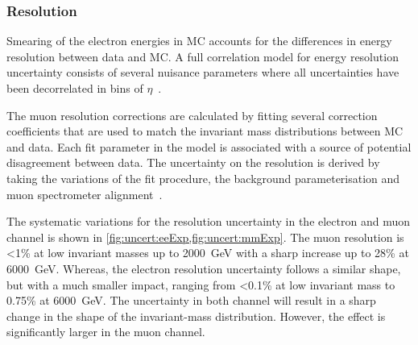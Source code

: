 \subsubsection{Resolution}
Smearing of the electron energies in MC accounts for the differences in energy resolution between data and MC. A full correlation model for energy resolution uncertainty consists of several nuisance parameters where all uncertainties have been decorrelated in bins of $\eta$~\cite{Aad:2019tso}.

The muon resolution corrections are calculated by fitting several correction coefficients that are used to match the invariant mass distributions between MC and data. Each fit parameter in the model is associated with a source of potential disagreement between data. The uncertainty on the resolution is derived by taking the variations of the fit procedure, the background parameterisation and muon spectrometer alignment~\cite{Aad:2016jkr}. 

The systematic variations for the resolution uncertainty in the electron and muon channel is shown in \cref{fig:uncert:eeExp,fig:uncert:mmExp}. The muon resolution is <1\% at low invariant masses up to \SI{2000}{\giga\electronvolt} with a sharp increase up to 28\% at \SI{6000}{\giga\electronvolt}. Whereas, the electron resolution uncertainty follows a similar shape, but with a much smaller impact, ranging from <0.1\% at low invariant mass to 0.75\% at \SI{6000}{\giga\electronvolt}. The uncertainty in both channel will result in a sharp change in the shape of the invariant-mass distribution. However, the effect is significantly larger in the muon channel. 

